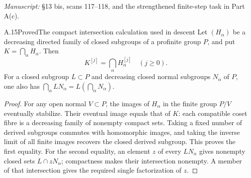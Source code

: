 \noindent\emph{Manuscript:} \S13 bis, scans 117--118, and the strengthened finite-step task in Part A(c).

\begin{claim}{A.15}{Proved}{The compact intersection calculation used in descent}
Let $(H_\alpha)$ be a decreasing directed family of closed subgroups of a profinite group $P$, and put $K=\bigcap_\alpha H_\alpha$. Then
\[
 K^{[j]}=\bigcap_\alpha H_\alpha^{[j]}\quad(j\ge0).
\]
For a closed subgroup $L\subset P$ and decreasing closed normal subgroups $N_\alpha$ of $P$, one also has $\bigcap_\alpha LN_\alpha=L(\bigcap_\alpha N_\alpha)$.
\end{claim}
\begin{proof}
For any open normal $V\subset P$, the images of $H_\alpha$ in the finite group $P/V$ eventually stabilize. Their eventual image equals that of $K$: each compatible coset fibre is a decreasing family of nonempty compact sets. Taking a fixed number of derived subgroups commutes with homomorphic images, and taking the inverse limit of all finite images recovers the closed derived subgroup. This proves the first equality. For the second equality, an element $z$ of every $LN_\alpha$ gives nonempty closed sets $L\cap zN_\alpha$; compactness makes their intersection nonempty. A member of that intersection gives the required single factorization of $z$.
\end{proof}

